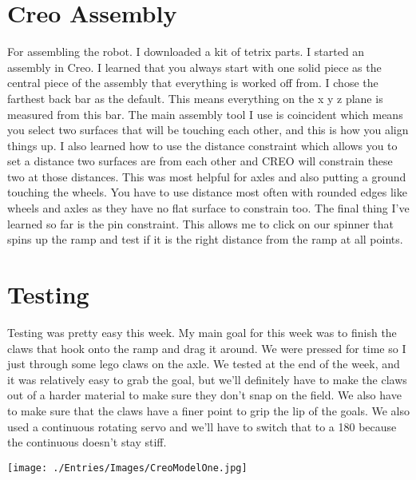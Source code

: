 \section*{Creo Assembly}
For assembling the robot. I downloaded a kit of tetrix parts. I started an assembly in Creo. I learned that you always start with one solid piece as the central piece of the assembly that everything is worked off from. I chose the farthest back bar as the default. This means everything on the x y z plane is measured from this bar. The main assembly tool I use is coincident which means you select two surfaces that will be touching each other, and this is how you align things up. I also learned how to use the distance constraint which allows you to set a distance two surfaces are from each other and CREO will constrain these two at those distances. This was most helpful for axles and also putting a ground touching the wheels. You have to use distance most often with rounded edges like wheels and axles as they have no flat surface to constrain too. The final thing I’ve learned so far is the pin constraint. This allows me to click on our spinner that spins up the ramp and test if it is the right distance from the ramp at all points.

\section*{Testing}
Testing was pretty easy this week. My main goal for this week was to finish the claws that hook onto the ramp and drag it around. We were pressed for time so I just through some lego claws on the axle. We tested at the end of the week, and it was relatively easy to grab the goal, but we’ll definitely have to make the claws out of a harder material to make sure they don’t snap on the field. We also have to make sure that the claws have a finer point to grip the lip of the goals. We also used a continuous rotating servo and we’ll have to switch that to a 180 because the continuous doesn’t stay stiff. 

\begin{center}
\texttt{[image: ./Entries/Images/CreoModelOne.jpg]}
\end{center}
